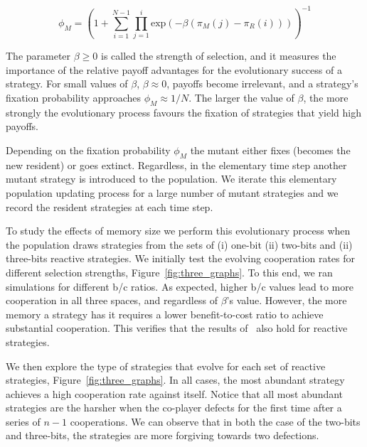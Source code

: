 \documentclass{article}
\theoremstyle{definition}
\begin{document}
\begin{equation}\label{eq:fixation_probability}
  \phi_{M} = \left(1 + \sum_{i=1}^{N - 1} \prod_{j=1}^{i} \text{exp} (- \beta (\pi_{M}(j) - \pi_{R}(i))) \right)^{-1}
\end{equation}

The parameter \(\beta \geq 0\) is called the strength of selection, and it
measures the importance of the relative payoff advantages for the
evolutionary success of a strategy. For small values of \(\beta\), \(\beta
\approx 0\), payoffs become irrelevant, and a strategy's fixation probability
approaches \(\phi_{M} \approx 1 / N\). The larger the value of \(\beta\), the
more strongly the evolutionary process favours the fixation of strategies that
yield high payoffs.

Depending on the fixation probability \(\phi_{M}\) the mutant either fixes
(becomes the new resident) or goes extinct. Regardless, in the elementary time
step another mutant strategy is introduced to the  population. We iterate this
elementary population updating process for a large number of mutant strategies
and we record the resident strategies at each time step.

To study the effects of memory size we perform this evolutionary process when
the population draws strategies from the sets of (i) one-bit (ii) two-bits and
(ii) three-bits reactive strategies. We initially test the evolving cooperation
rates for different selection strengths, Figure~\ref{fig:three_graphs}. To this end, we ran simulations for
different b/c ratios. As expected, higher b/c values lead to more cooperation in
all three spaces, and regardless of \(\beta\)'s value. However, the more memory
a strategy has it requires a lower benefit-to-cost ratio to achieve substantial
cooperation. This verifies that the results of~\citep{hilbe:PNAS:2017} also
hold for reactive strategies.

We then explore the type of strategies that evolve for each set of reactive
strategies, Figure~\ref{fig:three_graphs}. In all cases, the most abundant
strategy achieves a high cooperation rate against itself. Notice that all most
abundant strategies are the harsher when the co-player defects for the first
time after a series of \(n - 1\) cooperations. We can observe that in both the
case of the two-bits and three-bits, the strategies are more forgiving towards
two defections.
\end{document}
